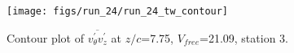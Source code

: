 \begin{figure}[H]
\centering
\texttt{[image: figs/run\_24/run\_24\_tw\_contour]}
\caption{Contour plot of $\overline{v_{\theta}^{\prime} v_{z}^{\prime}}$ at $z/c$=7.75, $V_{free}$=21.09, station 3.}
\label{fig:run_24_tw_contour}
\end{figure}


